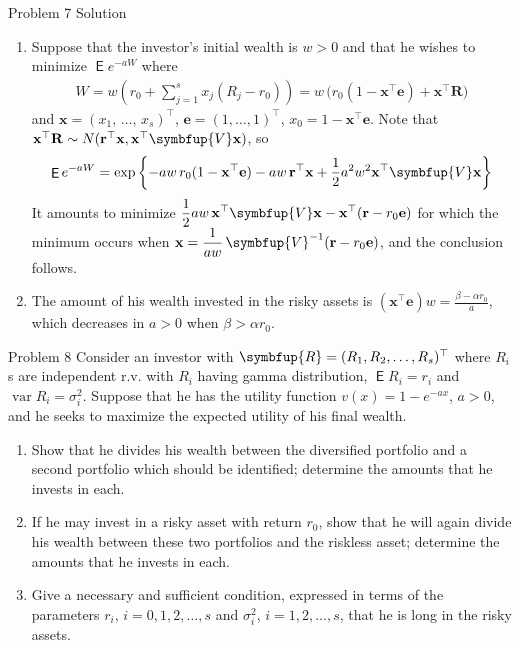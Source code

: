 \documentclass[10pt]{beamer}
\newcommand{\ds}{\displaystyle}
\newcommand{\vR}{\symbfup{R}}
\newcommand{\vV}{\symbfup{V}}
\DeclareMathOperator\expc{\mathsf{E}}
\DeclareMathOperator\var{var}
\theoremstyle{definition}
\begin{document}
\begin{frame}{Problem 7 Solution}
  \begin{enumerate}
    \item Suppose that the investor's initial wealth is $w > 0$ and that he wishes to minimize $\expc{e^{-aW}}$ where
      \begin{align*}
        W = w\left(r_0 + \sum_{j=1}^s x_j(R_j - r_0)\right) = w\,\big(r_0(1-\mathbf{x}^\top\mathbf{e}) + \mathbf{x}^\top\mathbf{R}\big)
      \end{align*}
      and $\mathbf{x} = (x_1,\,\ldots,\,x_s)^\top$, $\mathbf{e} = (1,\ldots,1)^\top$, $x_0 = 1 - \mathbf{x}^\top\mathbf{e}$. Note that $\mathbf{x}^\top\mathbf{R}\sim N(\mathbf{r}^\top\mathbf{x}, \mathbf{x}^\top\vV\mathbf{x})$, so 
      \begin{align*}
        \expc{e^{-aW}} = \exp\left\{-aw\,r_0(1-\mathbf{x}^\top\mathbf{e}) - aw\,\mathbf{r}^\top\mathbf{x} + \frac{1}{2}a^2w^2\mathbf{x}^\top\vV\mathbf{x}\right\}
      \end{align*}
      It amounts to minimize $\ds\frac{1}{2}aw\,\mathbf{x}^\top\vV\mathbf{x} - \mathbf{x}^\top(\mathbf{r} - r_0\mathbf{e})$ for which the minimum occurs when $\ds\mathbf{x} = \frac{1}{aw}\,\vV^{-1}(\mathbf{r} - r_0\mathbf{e})$, and the conclusion follows. 
    \item The amount of his wealth invested in the risky assets is $\ds(\mathbf{x}^\top\mathbf{e})w = \frac{\beta - \alpha r_0}{a}$, which decreases in $a > 0$ when $\beta > \alpha r_0$.
  \end{enumerate}
\end{frame}

\begin{frame}{Problem 8}
  Consider an investor with $\vR = (R_1, R_2, \ldots, R_s)^\top$ where $R_i$s are independent r.v. with $R_i$ having gamma distribution, $\expc{R_i} = r_i$ and $\var R_i = \sigma_i^2$. Suppose that he has the utility function $v(x) = 1 - e^{-ax}$, $a > 0$, and he seeks to maximize the expected utility of his final wealth. 
  \begin{enumerate}
    \item Show that he divides his wealth between the diversified portfolio and a second portfolio which should be identified; determine the amounts that he invests in each. 
    \item If he may invest in a risky asset with return $r_0$, show that he will again divide his wealth between these two portfolios and the riskless asset; determine the amounts that he invests in each. 
    \item Give a necessary and sufficient condition, expressed in terms of the parameters $r_i$, $i = 0, 1, 2, \ldots, s$ and $\sigma_i^2$, $i = 1, 2, \ldots, s$, that he is long in the risky assets.
  \end{enumerate}
\end{frame}
\end{document}
